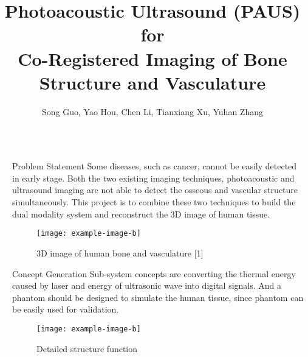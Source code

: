 \documentclass[final]{beamer}
\title{Photoacoustic Ultrasound (PAUS) for \\[.1in] Co-Registered Imaging of Bone \\[.1in] Structure and Vasculature \\[.1in]} %
\author{Song Guo, Yao Hou, Chen Li, Tianxiang Xu, Yuhan Zhang} %
\institute{Department and University Name} %
\begin{document}

\setlength{\belowcaptionskip}{2ex} %
\setlength\belowdisplayshortskip{2ex} %

\begin{frame}

\begin{columns}[t]

\begin{column}{\marginwidth}\end{column} %

\begin{column}{\colwidth} %
\begin{tcolorbox}[width=\colwidth,height=\contentheight,top=.2in]
\begin{block}{Problem Statement}
Some diseases, such as cancer, cannot be easily detected in early stage. Both the two existing imaging techniques, photoacoustic and ultrasound imaging are not able to detect the osseous and vascular structure simultaneously.  This project is to combine these two techniques to build the dual modality system and reconstruct the 3D image of human tissue.

\vspace{.2in}

\begin{figure}[H]
\texttt{[image: example-image-b]}
\caption{3D image of human bone and vasculature [1]}
\end{figure}

\end{block}

\vspace{-.5in}

\begin{block}{Concept Generation}
Sub-system concepts are converting the thermal energy caused by laser and energy of ultrasonic wave into digital signals. And a phantom should be designed to simulate the human tissue, since phantom can be easily used for validation.

\vspace{.2in}

\begin{figure}[H]
\texttt{[image: example-image-b]}
\caption{Detailed structure function}
\end{figure}


\end{block}
\end{tcolorbox}
\end{column}
\end{columns}
\end{frame}
\end{document}
